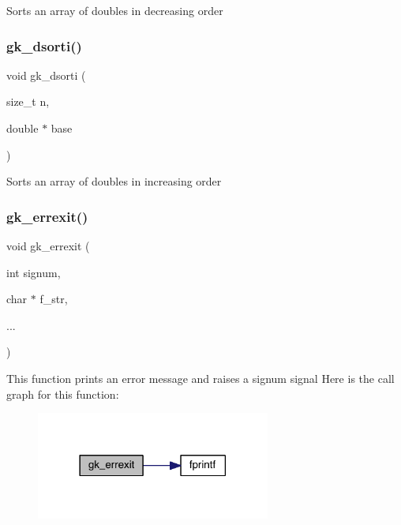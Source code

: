 Sorts an array of doubles in decreasing order \mbox{\label{a00077_ae20383e7b5471e1ad0ceb9d037035b91}} 
\subsubsection{\texorpdfstring{gk\+\_\+dsorti()}{gk\_dsorti()}}
{\footnotesize\ttfamily void gk\+\_\+dsorti (\begin{DoxyParamCaption}\item[{size\+\_\+t}]{n,  }\item[{double $\ast$}]{base }\end{DoxyParamCaption})}

Sorts an array of doubles in increasing order \mbox{\label{a00077_a88c677d7c48705f0dd18409b19542fe6}} 
\subsubsection{\texorpdfstring{gk\+\_\+errexit()}{gk\_errexit()}}
{\footnotesize\ttfamily void gk\+\_\+errexit (\begin{DoxyParamCaption}\item[{int}]{signum,  }\item[{char $\ast$}]{f\+\_\+str,  }\item[{}]{... }\end{DoxyParamCaption})}

This function prints an error message and raises a signum signal Here is the call graph for this function\+:\nopagebreak
\begin{figure}[H]
\begin{center}
\leavevmode
\includegraphics[width=218pt]{a00077_a88c677d7c48705f0dd18409b19542fe6_cgraph}
\end{center}
\end{figure}
\mbox{\label{a00077_a0fd03cab5187904b005485109d9fa2b5}} 
